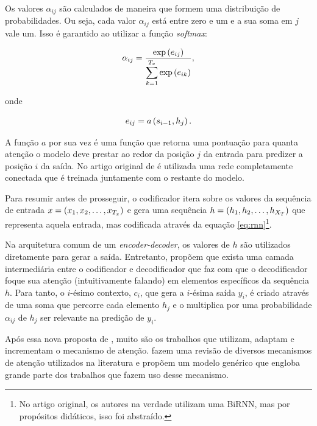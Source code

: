Os valores $\alpha_{ij}$ são calculados de maneira que formem uma distribuição
de probabilidades. Ou seja, cada valor $\alpha_{ij}$ está entre zero e um e a
sua soma em $j$ vale um. Isso é garantido ao utilizar a função \textit{softmax}:

\begin{equation}
  \alpha_{ij}=\dfrac{\exp\paren{e_{ij}}}
  {\spsum{k=1}{T_x}\exp\paren{e_{ik}}},
\end{equation}

onde

\begin{equation}
  e_{ij}=a\paren{s_{i-1},h_j}.
\end{equation}

A função $a$ por sua vez é uma função que retorna uma pontuação para quanta
atenção o modelo deve prestar ao redor da posição $j$ da entrada para predizer a
posição $i$ da saída. No artigo original de
\cite{bahdanau-etal:2014:attention-mechanism} é utilizada uma rede completamente
conectada que é treinada juntamente com o restante do modelo.

Para resumir antes de prosseguir, o codificador itera sobre os valores da
sequência de entrada $x=\paren{\seq{x}{T_x}}$ e gera uma sequência
$h=\paren{\seq{h}{X_T}}$ que representa aquela entrada, mas codificada através
da equação \ref{eq:rnn}\footnote{No artigo original, os autores na verdade
utilizam uma BiRNN, mas por propósitos didáticos, isso foi abstraído.}.

Na arquitetura comum de um \textit{encoder-decoder}, os valores de $h$ são
utilizados diretamente para gerar a saída. Entretanto,
\cite{bahdanau-etal:2014:attention-mechanism} propõem que exista uma camada
intermediária entre o codificador e decodificador que faz com que o
decodificador foque sua atenção (intuitivamente falando) em elementos
específicos da sequência $h$. Para tanto, o $i$-ésimo contexto, $c_i$, que
gera a $i$-ésima saída $y_i$, é criado através de uma soma que percorre cada
elemento $h_j$ e o multiplica por uma probabilidade $\alpha_{ij}$ de $h_j$ ser
relevante na predição de $y_i$.

Após essa nova proposta de \cite{bahdanau-etal:2014:attention-mechanism}, muito
são os trabalhos que utilizam, adaptam e incrementam o mecanismo de atenção.
\cite{galassi:2021:attention-in-nlp} fazem uma revisão de diversos mecanismos de
atenção utilizados na literatura e propõem um modelo genérico que engloba grande
parte dos trabalhos que fazem uso desse mecanismo.

